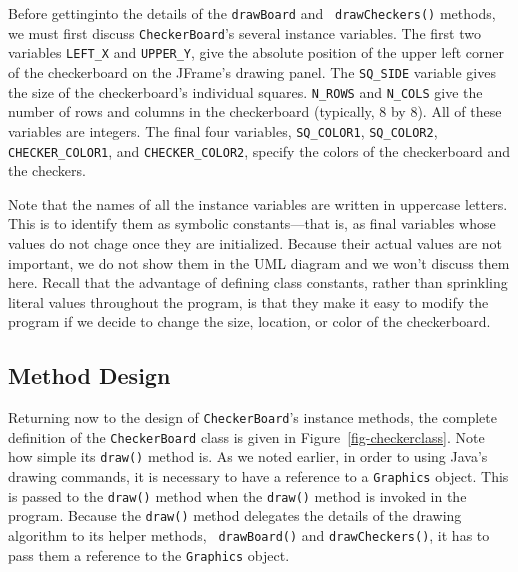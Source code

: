 Before gettinginto the details of the {\tt drawBoard} and {\tt
drawCheckers()} methods, we must first discuss {\tt CheckerBoard}'s
several instance variables.  The first two variables {\tt LEFT\_X} and
{\tt UPPER\_Y}, give the absolute position of the upper left corner of
the checkerboard on the JFrame's drawing panel. The {\tt SQ\_SIDE}
variable gives the size of the checkerboard's individual squares.
{\tt N\_ROWS} and {\tt N\_COLS} give the number of rows and columns in
the checkerboard (typically, 8 by 8). All of these variables are
integers.  The final four variables, {\tt SQ\_COLOR1}, {\tt SQ\_COLOR2},
{\tt CHECKER\_COLOR1}, and {\tt CHECKER\_COLOR2}, specify the colors
of the checkerboard and the checkers. 

Note that the names of all the instance variables are written in
uppercase letters. This is to identify them as symbolic
constants---that is, as final variables whose values do not chage once
they are initialized. Because their actual values are not important,
we do not show them in the UML diagram and we won't discuss them here.
Recall that the advantage of defining class constants, rather than
sprinkling literal values throughout the program, is that they make it
easy to modify the program if we decide to change the size, location,
or color of the checkerboard.

\subsection*{Method Design}
Returning now to the design of {\tt CheckerBoard}'s instance methods,
the complete definition of the {\tt CheckerBoard} class is given in
Figure~\ref{fig-checkerclass}. Note how simple its {\tt draw()} method
is.  As we noted earlier, in order to using Java's drawing commands,
it is necessary to have a reference to a {\tt Graphics} object. This
is passed to the {\tt draw()} method when the {\tt draw()} method is
invoked in the program.  Because the {\tt draw()} method delegates the
details of the drawing algorithm to its helper methods, {\tt
drawBoard()} and {\tt drawCheckers()}, it has to pass them a reference
to the {\tt Graphics} object.


